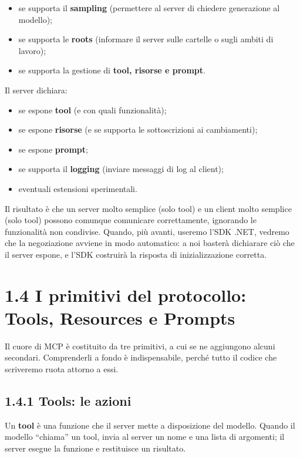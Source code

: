 \documentclass[
  italian,
  10pt,
]{book}
\providecommand{\tightlist}{%
  \setlength{\itemsep}{0pt}\setlength{\parskip}{0pt}}
\begin{document}
\begin{itemize}
\tightlist
\item
  se supporta il \textbf{sampling} (permettere al server di chiedere
  generazione al modello);
\item
  se supporta le \textbf{roots} (informare il server sulle cartelle o
  sugli ambiti di lavoro);
\item
  se supporta la gestione di \textbf{tool, risorse e prompt}.
\end{itemize}

Il server dichiara:

\begin{itemize}
\tightlist
\item
  se espone \textbf{tool} (e con quali funzionalità);
\item
  se espone \textbf{risorse} (e se supporta le sottoscrizioni ai
  cambiamenti);
\item
  se espone \textbf{prompt};
\item
  se supporta il \textbf{logging} (inviare messaggi di log al client);
\item
  eventuali estensioni sperimentali.
\end{itemize}

Il risultato è che un server molto semplice (solo tool) e un client
molto semplice (solo tool) possono comunque comunicare correttamente,
ignorando le funzionalità non condivise. Quando, più avanti, useremo
l'SDK .NET, vedremo che la negoziazione avviene in modo automatico: a
noi basterà dichiarare ciò che il server espone, e l'SDK costruirà la
risposta di inizializzazione corretta.

\section{1.4 I primitivi del protocollo: Tools, Resources e
Prompts}\label{i-primitivi-del-protocollo-tools-resources-e-prompts}

Il cuore di MCP è costituito da tre primitivi, a cui se ne aggiungono
alcuni secondari. Comprenderli a fondo è indispensabile, perché tutto il
codice che scriveremo ruota attorno a essi.

\subsection{1.4.1 Tools: le azioni}\label{tools-le-azioni}

Un \textbf{tool} è una funzione che il server mette a disposizione del
modello. Quando il modello ``chiama'' un tool, invia al server un nome e
una lista di argomenti; il server esegue la funzione e restituisce un
risultato.
\end{document}
